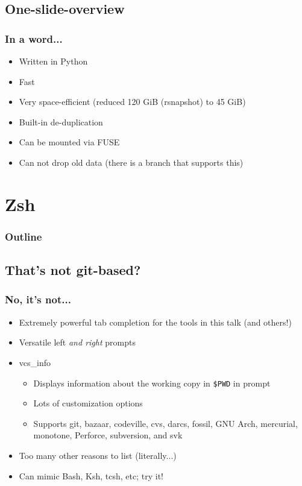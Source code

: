 \documentclass[t]{beamer}
\begin{document}
\subsection{One-slide-overview}

\begin{frame}
	\frametitle{In a word...}
	\begin{itemize}
		\item Written in Python
		\item Fast
		\item Very space-efficient (reduced 120 GiB (rsnapshot) to 45 GiB)
		\item Built-in de-duplication
		\item Can be mounted via FUSE
		\item Can not drop old data (there is a branch that supports this)
	\end{itemize}
\end{frame}


\section{Zsh}

\begin{frame}
	\frametitle{Outline}
	\tableofcontents[currentsection]
\end{frame}

\subsection{That's not git-based?}


\begin{frame}
	\frametitle{No, it's not...}
	\begin{itemize}
		\item Extremely powerful tab completion for the tools in this talk (and others!)
		\item Versatile left \emph{and right} prompts
		\item vcs\_info
		\begin{itemize}
			\item Displays information about the working copy in \texttt{\$PWD} in prompt
			\item Lots of customization options
			\item Supports git, bazaar, codeville, cvs, darcs, fossil, GNU Arch, mercurial, monotone, Perforce, subversion, and svk
		\end{itemize}
		\item Too many other reasons to list (literally...)
		\item Can mimic Bash, Ksh, tcsh, etc; try it!
	\end{itemize}
\end{frame}
\end{document}

